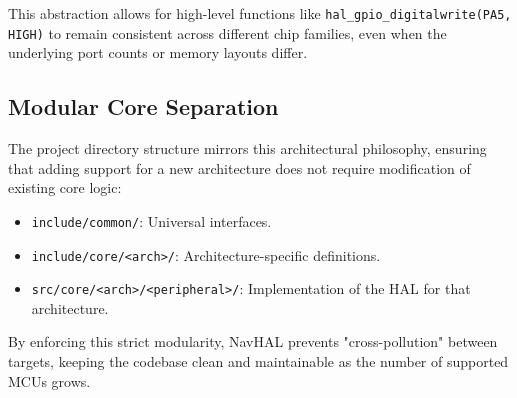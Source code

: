 This abstraction allows for high-level functions like \texttt{hal\_gpio\_digitalwrite(PA5, HIGH)} to remain consistent across different chip families, even when the underlying port counts or memory layouts differ.

\subsection{Modular Core Separation}
The project directory structure mirrors this architectural philosophy, ensuring that adding support for a new architecture does not require modification of existing core logic:

\begin{itemize}
    \item \texttt{include/common/}: Universal interfaces.
    \item \texttt{include/core/<arch>/}: Architecture-specific definitions.
    \item \texttt{src/core/<arch>/<peripheral>/}: Implementation of the HAL for that architecture.
\end{itemize}

By enforcing this strict modularity, NavHAL prevents "cross-pollution" between targets, keeping the codebase clean and maintainable as the number of supported MCUs grows.
